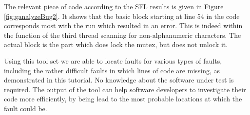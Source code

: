 	The relevant piece of code according to the SFL results is given in Figure \ref{fig:ganalyzeBug2}.
	It shows that the basic block starting at line 54 in the code corresponds most with the run
	which resulted in an error.
	This is indeed within the function of the third thread scanning for non-alphanumeric characters.
	The actual block is the part which does lock the mutex, but does not unlock it.
	
	Using this tool set we are able to locate faults for various types of faults,
	including the rather difficult faults in which lines of code are missing, 
	as demonstrated in this tutorial.
	No knowledge about the software under test is required.
	The output of the tool can help software developers to investigate their code more efficiently,
	by being lead to the most probable locations at which the fault could be.
	
